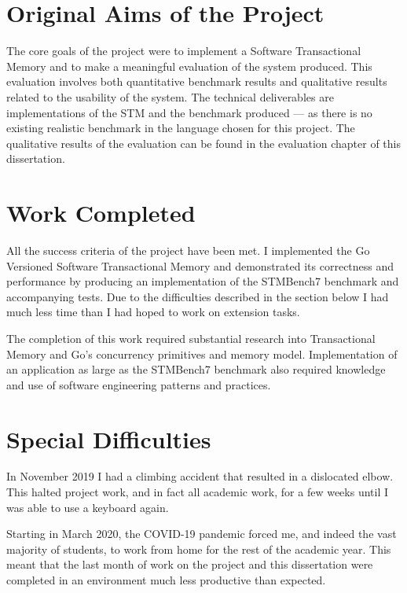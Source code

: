 \documentclass[12pt,a4paper,oneside,openright]{report}
\begin{document}
\section*{Original Aims of the Project}

The core goals of the project were to implement a Software
Transactional Memory and to make a meaningful evaluation of the system
produced. This evaluation involves both quantitative benchmark results
and qualitative results related to the usability of the system. The
technical deliverables are implementations of the STM and the
benchmark produced --- as there is no existing realistic benchmark in
the language chosen for this project. The qualitative results of the
evaluation can be found in the evaluation chapter of this
dissertation.

\section*{Work Completed}

All the success criteria of the project have been met. I implemented
the Go Versioned Software Transactional Memory and demonstrated its
correctness and performance by producing an implementation of the
STMBench7 benchmark and accompanying tests. Due to the difficulties
described in the section below I had much less time than I had hoped
to work on extension tasks.

The completion of this work required substantial research into
Transactional Memory and Go's concurrency primitives and memory
model. Implementation of an application as large as the STMBench7
benchmark also required knowledge and use of software engineering
patterns and practices.

\section*{Special Difficulties}

In November 2019 I had a climbing accident that resulted in a
dislocated elbow. This halted project work, and in fact all academic
work, for a few weeks until I was able to use a keyboard again.

Starting in March 2020, the COVID-19 pandemic forced me, and indeed
the vast majority of students, to work from home for the rest of the
academic year. This meant that the last month of work on the project
and this dissertation were completed in an environment much less
productive than expected.

\newpage
\end{document}
